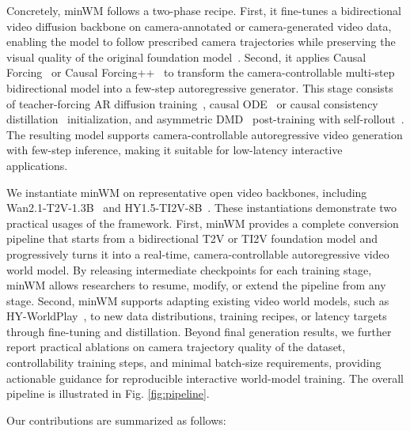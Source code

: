 \documentclass{llmxive}
\begin{document}
Concretely, minWM follows a two-phase recipe. First, it fine-tunes a bidirectional video diffusion backbone on camera-annotated or camera-generated video data, enabling the model to follow prescribed camera trajectories while preserving the visual quality of the original foundation model~\cite{li2026cameras}. Second, it applies Causal Forcing~\cite{zhu2026causal} or Causal Forcing++~\cite{zhao2026causal} to transform the camera-controllable multi-step bidirectional model into a few-step autoregressive generator. This stage consists of teacher-forcing AR diffusion training~\cite{teng2025magi}, causal ODE~\cite{zhu2026causal} or causal consistency distillation~\cite{zhao2026causal} initialization, and asymmetric DMD~\cite{wang2023prolificdreamer,luo2023diff,yin2024one,yin2025slow} post-training with self-rollout~\cite{huang2025self}. The resulting model supports camera-controllable autoregressive video generation with few-step inference, making it suitable for low-latency interactive applications.

We instantiate minWM on representative open video backbones, including Wan2.1-T2V-1.3B~\cite{wan2025wan} and HY1.5-TI2V-8B~\cite{kong2024hunyuanvideo}. These instantiations demonstrate two practical usages of the framework. First, minWM provides a complete conversion pipeline that starts from a bidirectional T2V or TI2V foundation model and progressively turns it into a real-time, camera-controllable autoregressive video world model. By releasing intermediate checkpoints for each training stage, minWM allows researchers to resume, modify, or extend the pipeline from any stage. Second, minWM supports adapting existing video world models, such as HY-WorldPlay~\cite{sun2025worldplay}, to new data distributions, training recipes, or latency targets through fine-tuning and distillation. Beyond final generation results, we further report practical ablations on camera trajectory quality of the dataset, controllability training steps, and minimal batch-size requirements, providing actionable guidance for reproducible interactive world-model training. The overall pipeline is illustrated in Fig. \ref{fig:pipeline}.

Our contributions are summarized as follows:
\end{document}
